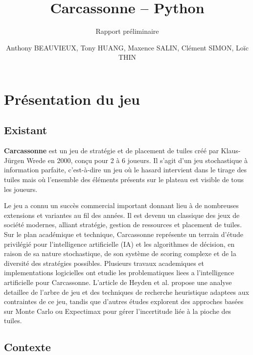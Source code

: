 \documentclass[11pt]{article}
\title{Carcassonne -- Python}
\subtitle{Rapport préliminaire}
\author{Anthony BEAUVIEUX, Tony HUANG, Maxence SALIN, Clément SIMON, Loïc THIN}
\date{}
\begin{document}

\maketitle
\thispagestyle{empty}


\section{Présentation du jeu}

\subsection{Existant}

\textbf{Carcassonne} est un jeu de stratégie et de placement de tuiles créé par Klaus-Jürgen Wrede en 2000, conçu pour 2 à 6 joueurs.
Il s'agit d'un jeu stochastique à information parfaite, c'est-à-dire un jeu où le hasard intervient dans le tirage des tuiles mais où l’ensemble des éléments présents sur le plateau est visible de tous les joueurs.

Le jeu a connu un succès commercial important donnant lieu à de nombreuses extensions et variantes au fil des années. Il est devenu un classique des jeux de société modernes, alliant stratégie, gestion de ressources et placement de tuiles. Sur le plan académique et technique, Carcassonne représente un terrain d’étude privilégié pour l’intelligence artificielle (IA) et les algorithmes de décision, en raison de sa nature stochastique, de son système de scoring complexe et de la diversité des stratégies possibles. Plusieurs travaux academiques et implementations
logicielles ont etudie les problematiques liees a l’intelligence artificielle pour Carcassonne. L’article de Heyden
et al.\cite{heyden2009implementing} propose une analyse detaillee de l’arbre de jeu et des techniques de recherche heuristique adaptees aux
contraintes de ce jeu, tandis que d’autres études explorent des approches basées sur Monte Carlo ou Expectimax
pour gérer l’incertitude liée à la pioche des tuiles. 


\subsection{Contexte}
\end{document}
